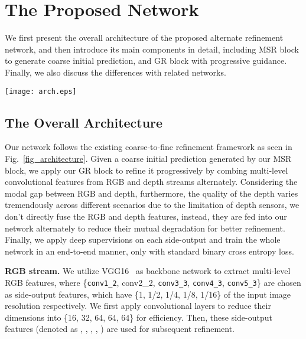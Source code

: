 \documentclass[runningheads]{llncs}
\begin{document}
\section{The Proposed Network}
We first present the overall architecture of the proposed alternate refinement network, and then introduce its main components in detail, including MSR block to generate coarse initial prediction, and GR block with progressive guidance. Finally, we also discuss the differences with related networks.

\begin{figure*}  
  \centering  
  \texttt{[image: arch.eps]}
  \caption{The overall architecture of the proposed network, where RGB feature and depth feature are fed into GR blocks \textbf{alternately} for refinement. Here, we only show single GR block in each side-output for clarity. Detailed structures of MSR and GR are illustrated in Fig.~\ref{fig_msr} and Fig.~\ref{fig_gr} respectively.}  
  \label{fig_architecture}  
\end{figure*}

\subsection{The Overall Architecture}
Our network follows the existing coarse-to-fine refinement framework as seen in Fig.~\ref{fig_architecture}. Given a coarse initial prediction generated by our MSR block, we apply our GR block to refine it progressively by combing multi-level convolutional features from RGB and depth streams alternately. Considering the modal gap between RGB and depth, furthermore, the quality of the depth varies tremendously across different scenarios due to the limitation of depth sensors, we don't directly fuse the RGB and depth features, instead, they are fed into our network alternately to reduce their mutual degradation for better refinement. Finally, we apply deep supervisions on each side-output and train the whole network in an end-to-end manner, only with standard binary cross entropy loss.

\textbf{RGB stream.} We utilize VGG16~\cite{simonyan2015very} as backbone network to extract multi-level RGB features, where \{{\texttt{conv1\_2}}, {conv2\_2}, {\texttt{conv3\_3}}, {\texttt{conv4\_3}}, {\texttt{conv5\_3}}\} are chosen as side-output features, which have \{1, 1/2, 1/4, 1/8, 1/16\} of the input image resolution respectively. We first apply  convolutional layers to reduce their dimensions into \{16, 32, 64, 64, 64\} for efficiency. Then, these side-output features (denoted as , , , , ) are used for subsequent refinement.
\end{document}
